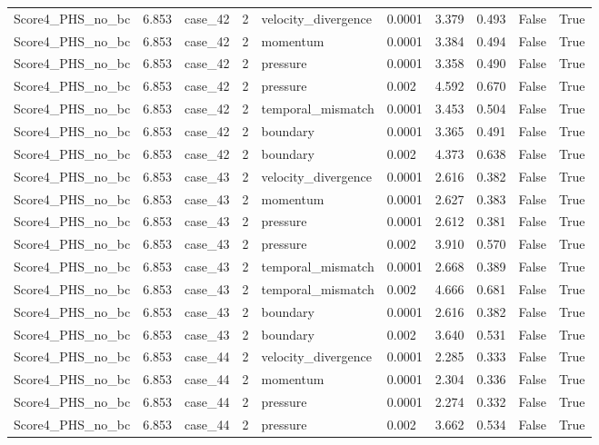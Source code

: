 \begin{longtable}{llllllllll}
Score4\_PHS\_no\_bc & 6.853 & case\_42 & 2 & velocity\_divergence & 0.0001 & 3.379 & 0.493 & False & True \\
Score4\_PHS\_no\_bc & 6.853 & case\_42 & 2 & momentum & 0.0001 & 3.384 & 0.494 & False & True \\
Score4\_PHS\_no\_bc & 6.853 & case\_42 & 2 & pressure & 0.0001 & 3.358 & 0.490 & False & True \\
Score4\_PHS\_no\_bc & 6.853 & case\_42 & 2 & pressure & 0.002 & 4.592 & 0.670 & False & True \\
Score4\_PHS\_no\_bc & 6.853 & case\_42 & 2 & temporal\_mismatch & 0.0001 & 3.453 & 0.504 & False & True \\
Score4\_PHS\_no\_bc & 6.853 & case\_42 & 2 & boundary & 0.0001 & 3.365 & 0.491 & False & True \\
Score4\_PHS\_no\_bc & 6.853 & case\_42 & 2 & boundary & 0.002 & 4.373 & 0.638 & False & True \\
Score4\_PHS\_no\_bc & 6.853 & case\_43 & 2 & velocity\_divergence & 0.0001 & 2.616 & 0.382 & False & True \\
Score4\_PHS\_no\_bc & 6.853 & case\_43 & 2 & momentum & 0.0001 & 2.627 & 0.383 & False & True \\
Score4\_PHS\_no\_bc & 6.853 & case\_43 & 2 & pressure & 0.0001 & 2.612 & 0.381 & False & True \\
Score4\_PHS\_no\_bc & 6.853 & case\_43 & 2 & pressure & 0.002 & 3.910 & 0.570 & False & True \\
Score4\_PHS\_no\_bc & 6.853 & case\_43 & 2 & temporal\_mismatch & 0.0001 & 2.668 & 0.389 & False & True \\
Score4\_PHS\_no\_bc & 6.853 & case\_43 & 2 & temporal\_mismatch & 0.002 & 4.666 & 0.681 & False & True \\
Score4\_PHS\_no\_bc & 6.853 & case\_43 & 2 & boundary & 0.0001 & 2.616 & 0.382 & False & True \\
Score4\_PHS\_no\_bc & 6.853 & case\_43 & 2 & boundary & 0.002 & 3.640 & 0.531 & False & True \\
Score4\_PHS\_no\_bc & 6.853 & case\_44 & 2 & velocity\_divergence & 0.0001 & 2.285 & 0.333 & False & True \\
Score4\_PHS\_no\_bc & 6.853 & case\_44 & 2 & momentum & 0.0001 & 2.304 & 0.336 & False & True \\
Score4\_PHS\_no\_bc & 6.853 & case\_44 & 2 & pressure & 0.0001 & 2.274 & 0.332 & False & True \\
Score4\_PHS\_no\_bc & 6.853 & case\_44 & 2 & pressure & 0.002 & 3.662 & 0.534 & False & True \\

\end{longtable}
